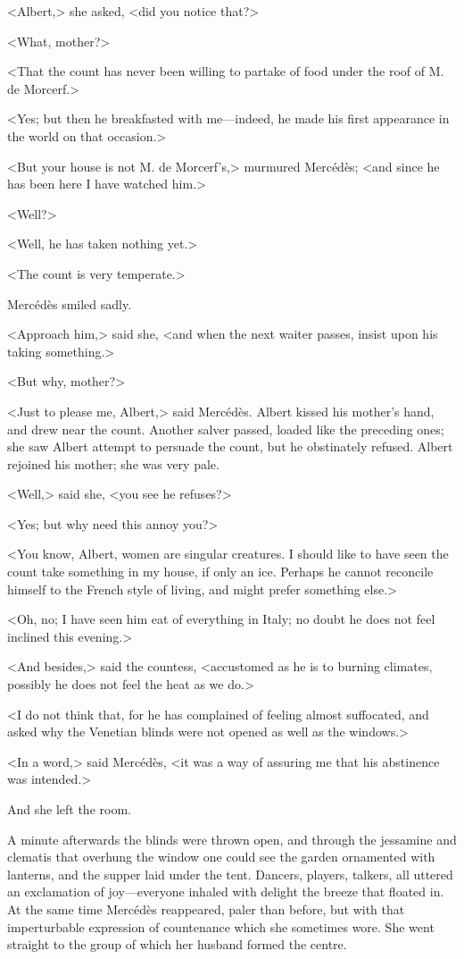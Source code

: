  <Albert,> she asked, <did you notice that?> 

 <What, mother?> 

 <That the count has never been willing to partake of food under the roof of M. de Morcerf.> 

 <Yes; but then he breakfasted with me—indeed, he made his first appearance in the world on that occasion.> 

 <But your house is not M. de Morcerf's,> murmured Mercédès; <and since he has been here I have watched him.> 

 <Well?> 

 <Well, he has taken nothing yet.> 

 <The count is very temperate.> 

 Mercédès smiled sadly. 

 <Approach him,> said she, <and when the next waiter passes, insist upon his taking something.> 

 <But why, mother?> 

 <Just to please me, Albert,> said Mercédès. Albert kissed his mother's hand, and drew near the count. Another salver passed, loaded like the preceding ones; she saw Albert attempt to persuade the count, but he obstinately refused. Albert rejoined his mother; she was very pale. 

 <Well,> said she, <you see he refuses?> 

 <Yes; but why need this annoy you?> 

 <You know, Albert, women are singular creatures. I should like to have seen the count take something in my house, if only an ice. Perhaps he cannot reconcile himself to the French style of living, and might prefer something else.> 

 <Oh, no; I have seen him eat of everything in Italy; no doubt he does not feel inclined this evening.> 

 <And besides,> said the countess, <accustomed as he is to burning climates, possibly he does not feel the heat as we do.> 

 <I do not think that, for he has complained of feeling almost suffocated, and asked why the Venetian blinds were not opened as well as the windows.> 

 <In a word,> said Mercédès, <it was a way of assuring me that his abstinence was intended.> 

 And she left the room. 

 A minute afterwards the blinds were thrown open, and through the jessamine and clematis that overhung the window one could see the garden ornamented with lanterns, and the supper laid under the tent. Dancers, players, talkers, all uttered an exclamation of joy—everyone inhaled with delight the breeze that floated in. At the same time Mercédès reappeared, paler than before, but with that imperturbable expression of countenance which she sometimes wore. She went straight to the group of which her husband formed the centre. 

